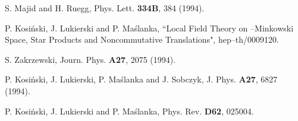 \documentclass[a4paper,12pt]{article}
\begin{document}
\begin{thebibliography}{99}
   S. Majid and H. Ruegg, Phys. Lett. {\bf 334B},
  384 (1994).

   P. Kosi\'{n}ski, J. Lukierski and P.
  Ma\'{s}lanka, ``Local  Field Theory on \myHighlight{$\kappa$}\coordHE{}--Minkowski
  Space, Star Products and Noncommutative Translations",
   hep--th/0009120.

    S. Zakrzewski, Journ. Phys. {\bf A27}, 2075
    (1994).

     P. Kosi\'{n}ski, J. Lukierski, P. Ma\'{s}lanka 
 and J. Sobczyk, J. Phys. {\bf A27}, 6827 (1994).

     P. Kosi\'{n}ski, J. Lukierski and P.
    Ma\'{s}lanka, Phys. Rev. {\bf D62}, 025004.

\end{thebibliography}
\end{document}
